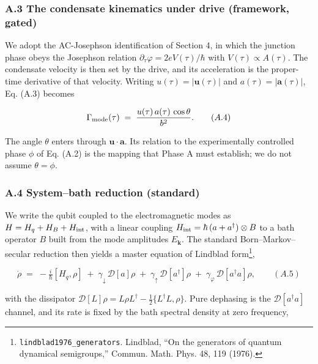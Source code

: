\documentclass[
  11pt,
]{article}
\begin{document}
\hypertarget{a.3-the-condensate-kinematics-under-drive-framework-gated}{%
\subsubsection{A.3 The condensate kinematics under drive (framework,
gated)}\label{a.3-the-condensate-kinematics-under-drive-framework-gated}}

We adopt the AC-Josephson identification of Section 4, in which the
junction phase obeys the Josephson relation
\(\partial_\tau\varphi = 2eV(\tau)/\hbar\) with
\(V(\tau)\propto A(\tau)\). The condensate velocity is then set by the
drive, and its acceleration is the proper-time derivative of that
velocity. Writing \(u(\tau)=|\mathbf{u}(\tau)|\) and
\(a(\tau)=|\mathbf{a}(\tau)|\), Eq. (A.3) becomes

\[
\Gamma_{\rm mode}(\tau) \;=\; \frac{u(\tau)\,a(\tau)\,\cos\theta}{b^2}. \qquad (A.4)
\]

The angle \(\theta\) enters through \(\mathbf{u}\!\cdot\!\mathbf{a}\).
Its relation to the experimentally controlled phase \(\phi\) of Eq.
(A.2) is the mapping that Phase A must establish; we do not assume
\(\theta=\phi\).

\hypertarget{a.4-systembath-reduction-standard}{%
\subsubsection{A.4 System--bath reduction
(standard)}\label{a.4-systembath-reduction-standard}}

We write the qubit coupled to the electromagnetic modes as
\(H = H_q + H_B + H_{\rm int}\), with a linear coupling
\(H_{\rm int}=\hbar\,(a+a^\dagger)\otimes B\) to a bath operator \(B\)
built from the mode amplitudes \(E_{\mathbf k}\). The standard
Born--Markov--secular reduction then yields a master equation of
Lindblad form\footnote{\texttt{lindblad1976\_generators}. Lindblad, ``On
  the generators of quantum dynamical semigroups,'' Commun. Math. Phys.
  48, 119 (1976).},

\[
\dot\rho \;=\; -\tfrac{i}{\hbar}[H_q,\rho] \;+\; \gamma_\downarrow\,\mathcal{D}[a]\rho \;+\; \gamma_\uparrow\,\mathcal{D}[a^\dagger]\rho \;+\; \gamma_\varphi\,\mathcal{D}[a^\dagger a]\rho, \qquad (A.5)
\]

with the dissipator
\(\mathcal{D}[L]\rho = L\rho L^\dagger - \tfrac12\{L^\dagger L,\rho\}\).
Pure dephasing is the \(\mathcal{D}[a^\dagger a]\) channel, and its rate
is fixed by the bath spectral density at zero frequency,
\end{document}
